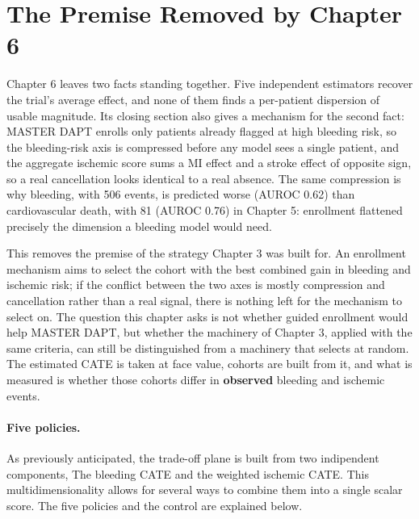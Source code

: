 
\section{The Premise Removed by Chapter 6}

Chapter 6 leaves two facts standing together. Five independent estimators
recover the
trial's average effect, and none of them finds a per-patient dispersion of usable magnitude. 
Its closing section also gives a
mechanism for the second fact: MASTER DAPT enrolls only patients already flagged at high
bleeding risk, so the bleeding-risk axis is compressed before any model sees a single
patient, and the aggregate ischemic score sums a MI effect and a stroke effect of
opposite sign, so a real cancellation looks identical to a real absence. The same
compression is why bleeding, with 506 events, is predicted worse (AUROC 0.62) than
cardiovascular death, with 81 (AUROC 0.76) in Chapter 5: enrollment flattened precisely
the dimension a bleeding model would need.

\vspace{10pt}

This removes the premise of the strategy Chapter 3 was built for. An enrollment
mechanism aims to select the cohort with the best combined gain in bleeding and ischemic
risk; if the conflict between the two axes is mostly compression and cancellation rather
than a real signal, there is nothing left for the mechanism to select on. The question
this chapter asks is not whether guided enrollment would help MASTER DAPT, but whether
the machinery of Chapter 3, applied with the same criteria, can still be distinguished
from a machinery that selects at random. The estimated CATE is taken at face value,
cohorts are built from it, and what is measured is whether those cohorts differ in
\textbf{observed} bleeding and ischemic events.

\paragraph{Five policies.}
As previously anticipated, the trade-off plane is built from two indipendent components,
The bleeding CATE and the weighted ischemic CATE.
This multidimensionality allows for several ways to combine them into a single scalar score.
The five policies and the control are explained below.

